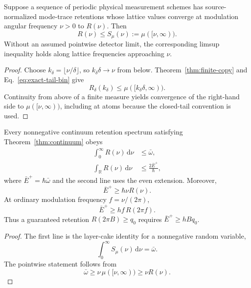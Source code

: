\documentclass[aps,pra,reprint,amsmath,amssymb,longbibliography]{revtex4-2}
\newcommand{\dd}{\mathrm{d}}
\begin{document}
\begin{theorem}
\label{thm:continuum}
Suppose a sequence of periodic physical measurement schemes has source-normalized mode-trace retentions whose lattice values converge at modulation angular frequency $\nu>0$ to $R(\nu)$.  Then
\begin{equation}
 \boxed{R(\nu)\leq S_\mu(\nu):=\mu([\nu,\infty)).}
 \label{eq:survival-law}
\end{equation}
Without an assumed pointwise detector limit, the corresponding limsup inequality holds along lattice frequencies approaching $\nu$.
\end{theorem}

\begin{proof}
Choose $k_\delta=\lfloor\nu/\delta\rfloor$, so $k_\delta\delta\to\nu$ from below.  Theorem~\ref{thm:finite-copy} and Eq.~\eqref{eq:exact-tail-bin} give
\begin{equation}
 R_\delta(k_\delta)\leq\mu([k_\delta\delta,\infty)).
\end{equation}
Continuity from above of a finite measure yields convergence of the right-hand side to $\mu([\nu,\infty))$, including at atoms because the closed-tail convention is used.
\end{proof}

\begin{corollary}
\label{cor:continuum-energy}
Every nonnegative continuum retention spectrum satisfying Theorem~\ref{thm:continuum} obeys
\begin{align}
 \int_0^\infty R(\nu)\,\dd\nu&\leq\bar\omega,\\
 \int_{\mathbb R}R(\nu)\,\dd\nu&\leq\frac{2\bar E^+}{\hbar},
 \label{eq:area-operational}
\end{align}
where $\bar E^+=\hbar\bar\omega$ and the second line uses the even extension.  Moreover,
\begin{equation}
 \boxed{\bar E^+\geq\hbar\nu R(\nu).}
 \label{eq:pointwise-energy}
\end{equation}
At ordinary modulation frequency $f=\nu/(2\pi)$,
\begin{equation}
 \boxed{\bar E^+\geq h f\,R(2\pi f).}
 \label{eq:hf-law}
\end{equation}
Thus a guaranteed retention $R(2\pi B)\geq q_0$ requires $\bar E^+\geq hBq_0$.
\end{corollary}

\begin{proof}
The first line is the layer-cake identity for a nonnegative random variable,
\begin{equation}
 \int_0^\infty S_\mu(\nu)\,\dd\nu=\bar\omega.
\end{equation}
The pointwise statement follows from
\begin{equation}
 \bar\omega\geq\nu\,\mu([\nu,\infty))\geq\nu R(\nu).
\end{equation}
\end{proof}
\end{document}
